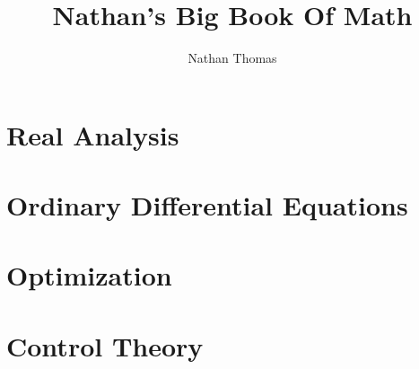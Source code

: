 \documentclass[12pt]{book}
\title{Nathan's Big Book Of Math}
\author{Nathan Thomas}
\begin{document}
\maketitle
\tableofcontents

\part{Real Analysis}
    
    
\part{Ordinary Differential Equations}
    
    
\part{Optimization}
    

\part{Control Theory}



\begin{appendix}
	\listoffigures
	\listoftables
\end{appendix}
	
\end{document}
